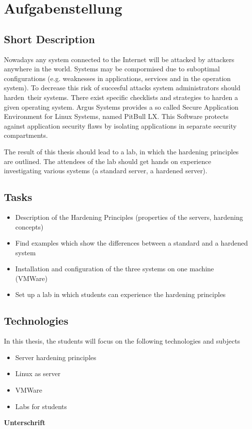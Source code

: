 \chapter*{Aufgabenstellung}
\label{cha:Aufgabenstellung}

\section*{Short Description}
\label{sec:ShortDescription}
Nowadays any system connected to the Internet will be attacked  by attackers anywhere in the world. Systems may be compormised due to suboptimal configurations (e.g. weaknesses in applications, services and in the operation system). To decrease this risk of succesful attacks system administrators should \glqq harden\grqq\ their systems. There exist specific checklists and strategies to harden a given operating system. Argus Systems provides a so called Secure Application Environment for Linux Systems, named PitBull LX. This Software protects against application security flaws by isolating applications in separate security compartments.

The result of this thesis should lead to a lab, in which the hardening principles are outlined. The attendees of the lab should get hands on experience investigating  various systems (a standard server, a hardened server).

\section*{Tasks}
\label{sec:Tasks}
\begin{itemize}
	\item	Description of the Hardening Principles (properties of the servers, hardening concepts)
    \item	Find examples which show the differences between a standard and a hardened system
	\item	Installation and configuration of the three systems on one machine (VMWare)
    \item	Set up a lab in which students can experience the hardening principles 
\end{itemize}

\pagebreak

\section*{Technologies}
\label{sec:Technologies}
In this thesis, the students will focus on the following technologies and subjects
\begin{itemize}
	\item	Server hardening principles
    \item	Linux as server
    \item	VMWare
    \item	Labs for students
\end{itemize}

\vspace*{100mm}
\noindent
\textbf{Unterschrift} \dotfill 